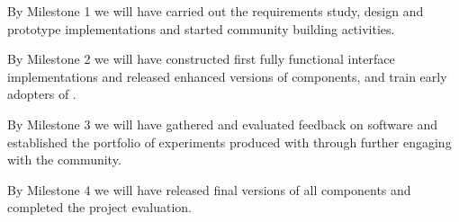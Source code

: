 
\begin{milestones}
  {By Milestone 1 we will have carried out the requirements study, design and prototype implementations and started community building activities.}

  {By Milestone 2 we will have constructed first fully functional interface implementations and released enhanced versions of \TheProject components, and train early adopters of \TheProject.}

  {By Milestone 3 we will have gathered and evaluated feedback on \TheProject software and established the portfolio of experiments produced with \TheProject through further engaging with the community.}

  {By Milestone 4 we will have released final versions of all \TheProject components and completed the project evaluation.}
\end{milestones}



